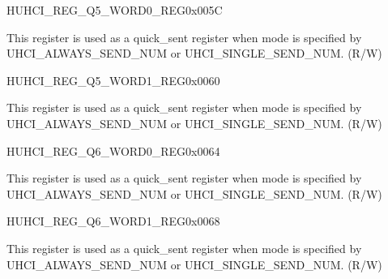 \begin{register}{H}{UHCI\_REG\_Q5\_WORD0\_REG}{0x005C}\label{regdesc:UHCIREGQ5WORD0REG}
%
\regnewline%
\begin{regdesc}\begin{reglist}
\label{fielddesc:UHCISENDQ5WORD0}\item [UHCI\_SEND\_Q5\_WORD0] This register is used as a quick\_sent register when mode is specified by UHCI\_ALWAYS\_SEND\_NUM or UHCI\_SINGLE\_SEND\_NUM. (R/W)
\end{reglist}\end{regdesc}
\end{register}


\begin{register}{H}{UHCI\_REG\_Q5\_WORD1\_REG}{0x0060}\label{regdesc:UHCIREGQ5WORD1REG}
%
\regnewline%
\begin{regdesc}\begin{reglist}
\label{fielddesc:UHCISENDQ5WORD1}\item [UHCI\_SEND\_Q5\_WORD1] This register is used as a quick\_sent register when mode is specified by UHCI\_ALWAYS\_SEND\_NUM or UHCI\_SINGLE\_SEND\_NUM. (R/W)
\end{reglist}\end{regdesc}
\end{register}


\begin{register}{H}{UHCI\_REG\_Q6\_WORD0\_REG}{0x0064}\label{regdesc:UHCIREGQ6WORD0REG}
%
\regnewline%
\begin{regdesc}\begin{reglist}
\label{fielddesc:UHCISENDQ6WORD0}\item [UHCI\_SEND\_Q6\_WORD0] This register is used as a quick\_sent register when mode is specified by UHCI\_ALWAYS\_SEND\_NUM or UHCI\_SINGLE\_SEND\_NUM. (R/W)
\end{reglist}\end{regdesc}
\end{register}


\begin{register}{H}{UHCI\_REG\_Q6\_WORD1\_REG}{0x0068}\label{regdesc:UHCIREGQ6WORD1REG}
%
\regnewline%
\begin{regdesc}\begin{reglist}
\label{fielddesc:UHCISENDQ6WORD1}\item [UHCI\_SEND\_Q6\_WORD1] This register is used as a quick\_sent register when mode is specified by UHCI\_ALWAYS\_SEND\_NUM or UHCI\_SINGLE\_SEND\_NUM. (R/W)
\end{reglist}\end{regdesc}
\end{register}


